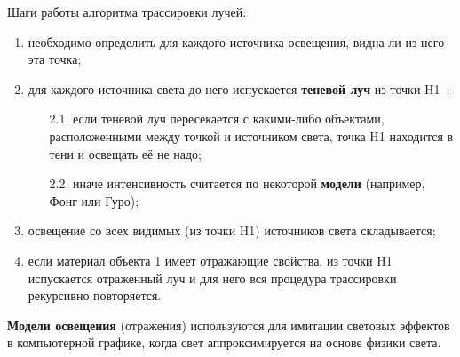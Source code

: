 Шаги работы алгоритма трассировки лучей:
\begin{enumerate}
	\item необходимо определить для каждого источника освещения, видна ли из него эта точка;
	\item для каждого источника света до него испускается \textbf{теневой луч} из точки H1~\cite{rt};
	\begin{enumerate}
		\item[2.1.] если теневой луч пересекается с какими-либо объектами, расположенными между точкой и источником света, точка H1 находится в тени и освещать её не надо;
		\item[2.2.] иначе интенсивность считается по некоторой \textbf{модели} (например, Фонг или Гуро);
	\end{enumerate}
	\item освещение со всех видимых (из точки H1) источников света складывается;
	\item если материал объекта 1 имеет отражающие свойства, из точки H1 испускается отраженный луч и для него вся процедура трассировки рекурсивно повторяется.
\end{enumerate}

\textbf{Модели освещения} (отражения) используются для имитации световых эффектов в компьютерной графике, когда свет аппроксимируется на основе физики света.

